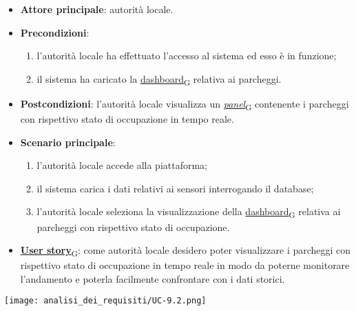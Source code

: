 \begin{itemize}
	\item \textbf{Attore principale}: autorità locale.
	\item \textbf{Precondizioni}:
	      \begin{enumerate}
		      \item l'autorità locale ha effettuato l'accesso al sistema ed esso è in funzione;
		      \item il sistema ha caricato la \href{https://7last.github.io/docs/pb/documentazione-interna/glossario\#dashboard}{dashboard\textsubscript{G}} relativa ai parcheggi.
	      \end{enumerate}
	\item \textbf{Postcondizioni}: l'autorità locale visualizza un \href{https://7last.github.io/docs/pb/documentazione-interna/glossario\#panel}{\textit{panel}\textsubscript{G}} contenente i parcheggi con rispettivo stato di occupazione in tempo reale.
	\item \textbf{Scenario principale}:
	      \begin{enumerate}
		      \item l'autorità locale accede alla piattaforma;
		      \item il sistema carica i dati relativi ai sensori interrogando il database;
		      \item l'autorità locale seleziona la visualizzazione della \href{https://7last.github.io/docs/pb/documentazione-interna/glossario\#dashboard}{dashboard\textsubscript{G}} relativa ai parcheggi con rispettivo stato di occupazione.
	      \end{enumerate}
	\item \href{https://7last.github.io/docs/pb/documentazione-interna/glossario\#user-story}{\textbf{User story}\textsubscript{G}}:
	      come autorità locale desidero poter visualizzare i parcheggi con rispettivo stato di occupazione in tempo reale in modo da poterne monitorare l'andamento
	      e poterla facilmente confrontare con i dati storici.
\end{itemize}
\begin{center}
	\texttt{[image: analisi\_dei\_requisiti/UC-9.2.png]}
\end{center}
